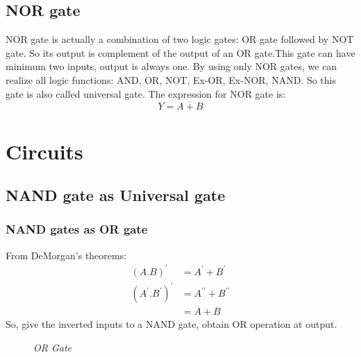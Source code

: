 	\subsection{NOR gate}
		NOR gate is actually a combination of two logic gates: OR gate followed by NOT gate. So its output is complement of the output of an OR gate.This gate can have minimum two inputs, output is always one. By using only NOR gates, we can realize all logic functions: AND, OR, NOT, Ex-OR, Ex-NOR, NAND. So this gate is also called universal gate.
		The expression for NOR gate is:
		$$Y = \overline{A+B}$$

\section{Circuits}
	\subsection{NAND gate as Universal gate}
		\subsubsection{NAND gates as OR gate}			
			From DeMorgan’s theorems:
			\begin{align*}
				(A.B)^\prime &= A^\prime + B^\prime \\
				(A^\prime .B^\prime)^\prime &= A^{\prime\prime} + B^{\prime\prime} \\
				&= A + B
			\end{align*}
			So, give the inverted inputs to a NAND gate, obtain OR operation at output.
			\begin{figure}[ht]
				\centering
				\hfill
				\caption{\textit{OR Gate}}
			\end{figure}			
	
